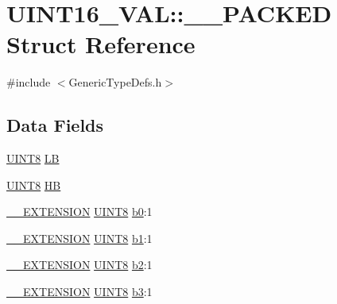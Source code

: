 \hypertarget{struct_u_i_n_t16___v_a_l_1_1_____p_a_c_k_e_d}{}\section{U\+I\+N\+T16\+\_\+\+V\+A\+L\+:\+:\+\_\+\+\_\+\+P\+A\+C\+K\+E\+D Struct Reference}
\label{struct_u_i_n_t16___v_a_l_1_1_____p_a_c_k_e_d}


{\ttfamily \#include $<$Generic\+Type\+Defs.\+h$>$}

\subsection*{Data Fields}
\begin{DoxyCompactItemize}
\item 
\hyperlink{_generic_type_defs_8h_ab27e9918b538ce9d8ca692479b375b6a}{U\+I\+N\+T8} \hyperlink{struct_u_i_n_t16___v_a_l_1_1_____p_a_c_k_e_d_ad074927327d05194b939086b9057965f}{L\+B}
\item 
\hyperlink{_generic_type_defs_8h_ab27e9918b538ce9d8ca692479b375b6a}{U\+I\+N\+T8} \hyperlink{struct_u_i_n_t16___v_a_l_1_1_____p_a_c_k_e_d_adbba4c04e746293c1544e753bc685e06}{H\+B}
\item 
\hyperlink{_generic_type_defs_8h_a6f634b0fdcc4febac630fc28e2685ddb}{\+\_\+\+\_\+\+E\+X\+T\+E\+N\+S\+I\+O\+N} \hyperlink{_generic_type_defs_8h_ab27e9918b538ce9d8ca692479b375b6a}{U\+I\+N\+T8} \hyperlink{struct_u_i_n_t16___v_a_l_1_1_____p_a_c_k_e_d_a4074b3ee420d7782dce819fb031c29a2}{b0}\+:1
\item 
\hyperlink{_generic_type_defs_8h_a6f634b0fdcc4febac630fc28e2685ddb}{\+\_\+\+\_\+\+E\+X\+T\+E\+N\+S\+I\+O\+N} \hyperlink{_generic_type_defs_8h_ab27e9918b538ce9d8ca692479b375b6a}{U\+I\+N\+T8} \hyperlink{struct_u_i_n_t16___v_a_l_1_1_____p_a_c_k_e_d_abd793f2202642a6be403e0532d5ad5ac}{b1}\+:1
\item 
\hyperlink{_generic_type_defs_8h_a6f634b0fdcc4febac630fc28e2685ddb}{\+\_\+\+\_\+\+E\+X\+T\+E\+N\+S\+I\+O\+N} \hyperlink{_generic_type_defs_8h_ab27e9918b538ce9d8ca692479b375b6a}{U\+I\+N\+T8} \hyperlink{struct_u_i_n_t16___v_a_l_1_1_____p_a_c_k_e_d_a2ad49445b4bb437bcd0e0c20c5d21050}{b2}\+:1
\item 
\hyperlink{_generic_type_defs_8h_a6f634b0fdcc4febac630fc28e2685ddb}{\+\_\+\+\_\+\+E\+X\+T\+E\+N\+S\+I\+O\+N} \hyperlink{_generic_type_defs_8h_ab27e9918b538ce9d8ca692479b375b6a}{U\+I\+N\+T8} \hyperlink{struct_u_i_n_t16___v_a_l_1_1_____p_a_c_k_e_d_a8392e255640c8dfc55767a2a8e9fa1a0}{b3}\+:1

\end{DoxyCompactItemize}
